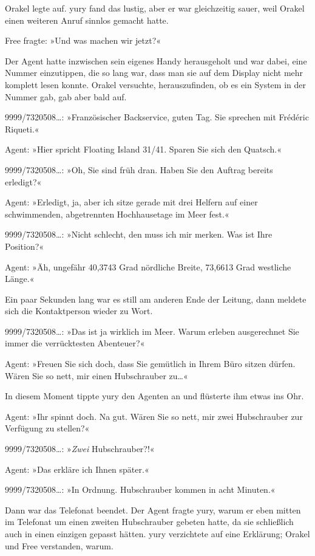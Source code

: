 Orakel legte auf. yury fand das lustig, aber er war gleichzeitig sauer, weil Orakel einen weiteren Anruf sinnlos gemacht hatte.

Free fragte: »Und was machen wir jetzt?«

Der Agent hatte inzwischen sein eigenes Handy herausgeholt und war dabei, eine Nummer einzutippen, die so lang war, dass man sie auf dem Display nicht mehr komplett lesen konnte. Orakel versuchte, herauszufinden, ob es ein System in der Nummer gab, gab aber bald auf.

9999/7320508…: »Französischer Backservice, guten Tag. Sie sprechen mit Frédéric Riqueti.«

Agent: »Hier spricht Floating Island 31/41. Sparen Sie sich den Quatsch.«

9999/7320508…: »Oh, Sie sind früh dran. Haben Sie den Auftrag bereits erledigt?«

Agent: »Erledigt, ja, aber ich sitze gerade mit drei Helfern auf einer schwimmenden, abgetrennten Hochhausetage im Meer fest.«

9999/7320508…: »Nicht schlecht, den muss ich mir merken. Was ist Ihre Position?«

Agent: »Äh, ungefähr 40,3743 Grad nördliche Breite, 73,6613 Grad westliche Länge.«

Ein paar Sekunden lang war es still am anderen Ende der Leitung, dann meldete sich die Kontaktperson wieder zu Wort.

9999/7320508…: »Das ist ja wirklich im Meer. Warum erleben ausgerechnet Sie immer die verrücktesten Abenteuer?«

Agent: »Freuen Sie sich doch, dass Sie gemütlich in Ihrem Büro sitzen dürfen. Wären Sie so nett, mir einen Hubschrauber zu…«

In diesem Moment tippte yury den Agenten an und flüsterte ihm etwas ins Ohr.

Agent: »Ihr spinnt doch. Na gut. Wären Sie so nett, mir zwei Hubschrauber zur Verfügung zu stellen?«

9999/7320508…: »\textit{Zwei} Hubschrauber?!«

Agent: »Das erkläre ich Ihnen später.«

9999/7320508…: »In Ordnung. Hubschrauber kommen in acht Minuten.«

Dann war das Telefonat beendet. Der Agent fragte yury, warum er eben mitten im Telefonat um einen zweiten Hubschrauber gebeten hatte, da sie schließlich auch in einen einzigen gepasst hätten. yury verzichtete auf eine Erklärung; Orakel und Free verstanden, warum.


